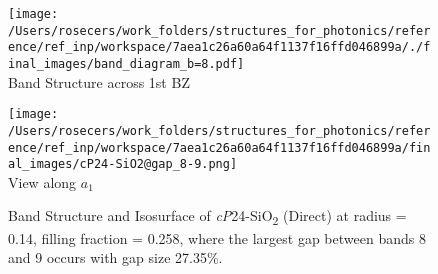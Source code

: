 \begin{figure}[H]
\begin{minipage}{0.5\textwidth}\centering
\texttt{[image: /Users/rosecers/work\_folders/structures\_for\_photonics/reference/ref\_inp/workspace/7aea1c26a60a64f1137f16ffd046899a/./final\_images/band\_diagram\_b=8.pdf]}
\\Band Structure across 1st BZ
\end{minipage}\hfill
\begin{minipage}{0.48\textwidth}\centering
\texttt{[image: /Users/rosecers/work\_folders/structures\_for\_photonics/reference/ref\_inp/workspace/7aea1c26a60a64f1137f16ffd046899a/final\_images/cP24-SiO2@gap\_8-9.png]}
\\View along $a_1$ 
\end{minipage}\hfill\caption{Band Structure and Isosurface of \textit{cP}24-SiO\textsubscript{2} (Direct) at radius = 0.14, filling fraction = 0.258, where the largest gap between bands 8 and 9 occurs with gap size 27.35\%.}

\end{figure}
\vspace{-0.25in}

